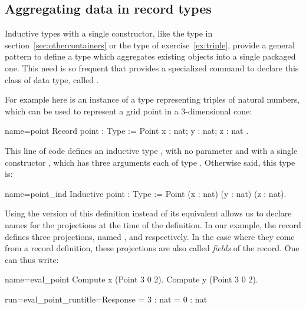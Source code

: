 \subsection{Aggregating data in record types}
\label{sec:records}

Inductive types with a single constructor, like the type  in
section~\ref{sec:othercontainers} or the type  of
exercise~\ref{ex:triple}, provide a general pattern to define a type
which aggregates existing objects into a single packaged one. This
need is so frequent that \Coq{} provides a specialized command
to declare this class of data type, called .

For example here is an instance of a type representing triples of
natural numbers, which can be used to represent a grid point in a
3-dimensional cone:

\begin{coq}{name=point}{}
Record point : Type := Point { x : nat; y : nat; z : nat }.
\end{coq}
This line of code defines an inductive type , with no
parameter and with a single constructor , which has three
arguments each of type . Otherwise said, this type is:

\begin{coq}{name=point_ind}{}
Inductive point : Type := Point (x : nat) (y : nat) (z : nat).
\end{coq}

Using the  version of this definition instead of its
equivalent  allows us to declare names for the projections
at the time of the definition. In our example, the record 
defines three projections, named ,  and 
respectively. In the case where they come from a record definition,
these projections are also called \emph{fields} of the record.
One can thus write:

\begin{coq-left}{name=eval_point}{}
Compute x (Point 3 0 2).
Compute y (Point 3 0 2).
\end{coq-left}{}{}
\begin{coqout-right}{run=eval_point_run}{title=Response}
= 3 : nat
= 0 : nat
\end{coqout-right}{}{}

